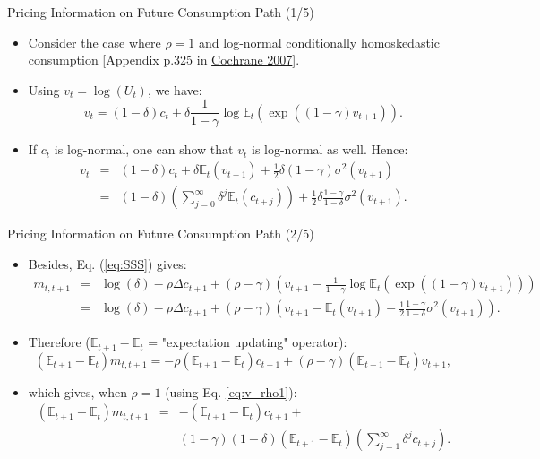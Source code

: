 \begin{frame}{Pricing Information on Future Consumption Path (1/5)}
\begin{footnotesize}
\begin{itemize}
	\item Consider the case where $\rho = 1$ and log-normal conditionally homoskedastic consumption [Appendix p.325 in \href{http://faculty.chicagobooth.edu/john.cochrane/research/papers/financial_and_real_proofs_aug_07.pdf}{Cochrane 2007}].
	\item Using $v_t = \log(U_t)$, we have:
	$$
	v_t = (1 - \delta) c_t + \delta \frac{1}{1 - \gamma} \log \mathbb{E}_t \left(\exp((1-\gamma)v_{t+1})\right).
	$$
	\item If $c_t$ is log-normal, one can show that $v_t$ is log-normal as well. Hence:
	\begin{eqnarray}
	v_t &=& (1 - \delta) c_t + \delta \mathbb{E}_t(v_{t+1}) + \frac{1}{2}\delta (1-\gamma) \sigma^2(v_{t+1})\nonumber \\
	&=& (1 - \delta) \left( \sum_{j=0}^{\infty}  \delta^j \mathbb{E}_t (c_{t+j}) \right) + \frac{1}{2}\delta \frac{1-\gamma}{1-\delta} \sigma^2(v_{t+1}) \label{eq:v_rho1}.
	\end{eqnarray}
\end{itemize}
\end{footnotesize}
\end{frame}

\begin{frame}{Pricing Information on Future Consumption Path (2/5)}
\begin{footnotesize}
\begin{itemize}
	\item Besides, Eq. (\ref{eq:SSS}) gives:
	\begin{eqnarray*}
	m_{t,t+1} &=& \log(\delta) - \rho \Delta c_{t+1} + (\rho - \gamma) \left(v_{t+1} - \frac{1}{1 - \gamma} \log \mathbb{E}_t \left(\exp((1-\gamma)v_{t+1})\right)\right)\\
	&=& \log(\delta) - \rho \Delta c_{t+1} + (\rho - \gamma) \left(v_{t+1} - \mathbb{E}_t(v_{t+1}) - \frac{1}{2} \frac{1-\gamma}{1-\delta} \sigma^2(v_{t+1})\right).
	\end{eqnarray*}
	\item Therefore ($\mathbb{E}_{t+1} - \mathbb{E}_t$ = "expectation updating" operator):
	$$
	(\mathbb{E}_{t+1} - \mathbb{E}_t) m_{t,t+1} = - \rho(\mathbb{E}_{t+1} - \mathbb{E}_t) c_{t+1} + (\rho - \gamma) (\mathbb{E}_{t+1} - \mathbb{E}_t) v_{t+1},
	$$
	\item which gives, when $\rho = 1$ (using Eq. \ref{eq:v_rho1}):
	\begin{eqnarray}
	(\mathbb{E}_{t+1} - \mathbb{E}_t) m_{t,t+1} &=& - (\mathbb{E}_{t+1} - \mathbb{E}_t) c_{t+1} +  \\
	&& (1 - \gamma)(1 - \delta) (\mathbb{E}_{t+1} - \mathbb{E}_t) \left(  \sum_{j=1}^{\infty}  \delta^j c_{t+j}  \right).\nonumber
	\end{eqnarray}
\end{itemize}
\end{footnotesize}
\end{frame}


